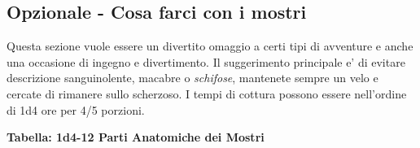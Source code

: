 \begin{multicols}{2}
\subsection{Opzionale - Cosa farci con i mostri}

Questa sezione vuole essere un divertito omaggio a certi tipi di avventure e anche una occasione di ingegno e divertimento. Il suggerimento principale e' di evitare descrizione sanguinolente, macabre o \emph{schifose}, mantenete sempre un velo e cercate di rimanere sullo scherzoso. I tempi di cottura possono essere nell'ordine di 1d4 ore per 4/5 porzioni.

\smallskip

\textbf{Tabella: 1d4-12 Parti Anatomiche dei Mostri}

\smallskip


\end{multicols}
